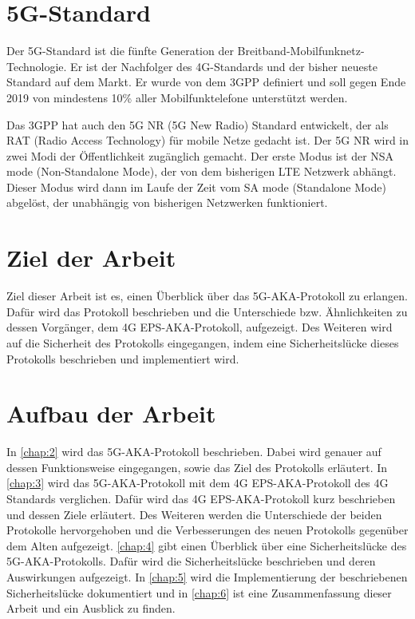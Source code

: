 \section{5G-Standard}
Der 5G-Standard ist die fünfte Generation der Breitband-Mobilfunknetz-Technologie. %
Er ist der Nachfolger des 4G-Standards und der bisher neueste Standard auf dem Markt.
Er wurde von dem 3GPP definiert und soll gegen Ende 2019 von mindestens 10\% aller Mobilfunktelefone unterstützt werden. %

Das 3GPP hat auch den 5G NR (5G New Radio) Standard entwickelt, der als RAT (Radio Access Technology) für mobile Netze gedacht ist. %
Der 5G NR wird in zwei Modi der Öffentlichkeit zugänglich gemacht. 
Der erste Modus ist der NSA mode (Non-Standalone Mode), der von dem bisherigen LTE Netzwerk abhängt. %
Dieser Modus wird dann im Laufe der Zeit vom SA mode (Standalone Mode) abgelöst, der unabhängig von bisherigen Netzwerken funktioniert. %


\section{Ziel der Arbeit}
Ziel dieser Arbeit ist es, einen Überblick über das 5G-AKA-Protokoll zu erlangen. 
Dafür wird das Protokoll beschrieben und die Unterschiede bzw. Ähnlichkeiten zu dessen Vorgänger, dem 4G EPS-AKA-Protokoll, aufgezeigt. 
Des Weiteren wird auf die Sicherheit des Protokolls eingegangen, indem eine Sicherheitslücke dieses Protokolls beschrieben und implementiert wird. %


\section{Aufbau der Arbeit}
In \cref{chap:2} wird das 5G-AKA-Protokoll beschrieben. 
Dabei wird genauer auf dessen Funktionsweise eingegangen, sowie das Ziel des Protokolls erläutert. In \cref{chap:3} wird das 5G-AKA-Protokoll mit dem 4G EPS-AKA-Protokoll des 4G Standards verglichen. 
Dafür wird das 4G EPS-AKA-Protokoll kurz beschrieben und dessen Ziele erläutert. 
Des Weiteren werden die Unterschiede der beiden Protokolle hervorgehoben und die Verbesserungen des neuen Protokolls gegenüber dem Alten aufgezeigt.
\cref{chap:4} gibt einen Überblick über eine Sicherheitslücke des 5G-AKA-Protokolls. 
Dafür wird die Sicherheitslücke beschrieben und deren Auswirkungen aufgezeigt. 
In \cref{chap:5} wird die Implementierung der beschriebenen Sicherheitslücke dokumentiert und in \cref{chap:6} ist eine Zusammenfassung dieser Arbeit und ein Ausblick zu finden.






